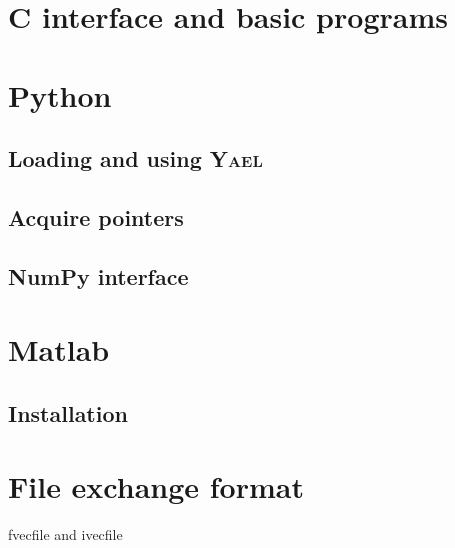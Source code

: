 \documentclass[a4paper,11pt,notitlepage,final,twoside]{report}
\newcommand{\yael}{\textsc{Yael}}
\begin{document}
\chapter{C interface and basic programs}

\chapter{Python}

\section{Loading and using \yael}

\section{Acquire pointers}

\section{NumPy interface}


\chapter{Matlab}

\section{Installation}



\appendix                     %

\chapter{File exchange format}               %

fvecfile and ivecfile




\end{document}
